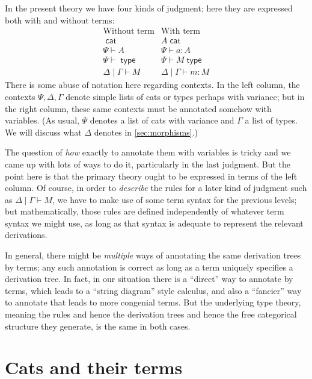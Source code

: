 \documentclass{amsart}
\let\types\vdash %
\def\cb{\mid} %
\def\cat{\;\mathsf{cat}}
\def\type{\;\mathsf{type}}
\theoremstyle{definition}
\begin{document}
In the present theory we have four kinds of judgment; here they are expressed both with and without terms:
\[\begin{array}{c|c}
    \text{Without term} & \text{With term}\\\hline
    \cat & A \cat\\
    \Psi \types A & \Psi \types a:A\\
    \Psi \types \type & \Psi \types M \type\\
    \Delta \cb \Gamma \types M & \Delta \cb \Gamma\types m:M
  \end{array}\]
There is some abuse of notation here regarding contexts.
In the left column, the contexts $\Psi,\Delta,\Gamma$ denote simple lists of cats or types perhaps with variance; but in the right column, these same contexts must be annotated somehow with variables.
(As usual, $\Psi$ denotes a list of cats with variance and $\Gamma$ a list of types.
We will discuss what $\Delta$ denotes in \cref{sec:morphisms}.)

The question of \emph{how} exactly to annotate them with variables is tricky and we came up with lots of ways to do it, particularly in the last judgment.
But the point here is that the primary theory ought to be expressed in terms of the left column.
Of course, in order to \emph{describe} the rules for a later kind of judgment such as $\Delta\cb \Gamma\types M$, we have to make use of some term syntax for the previous levels; but mathematically, those rules are defined independently of whatever term syntax we might use, as long as that syntax is adequate to represent the relevant derivations.

In general, there might be \emph{multiple} ways of annotating the same derivation trees by terms; any such annotation is correct as long as a term uniquely specifies a derivation tree.
In fact, in our situation there is a ``direct'' way to annotate by terms, which leads to a ``string diagram'' style calculus, and also a ``fancier'' way to annotate that leads to more congenial terms.
But the underlying type theory, meaning the rules and hence the derivation trees and hence the free categorical structure they generate, is the same in both cases.


\section{Cats and their terms}
\label{sec:cats}
\end{document}
